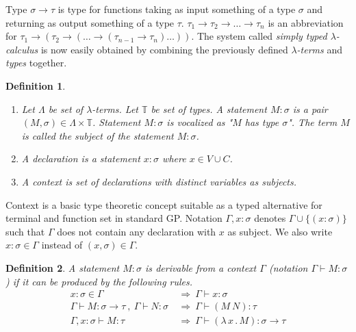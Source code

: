 \documentclass[conference]{IEEEtran}
\newtheorem{definition}{Definition}
\newcommand{\lterms}{$\lambda$-terms\xspace}
\newcommand{\tur}[3]{#1\vdash{}#2 \colon #3}
\newcommand{\then}{\Rightarrow\xspace}
\newcommand{\lamb}[2]{( \lambda \, #1 \, . \, #2 )}
\newcommand{\ar}{\rightarrow\xspace}
\begin{document}
Type $\sigma \ar \tau$ is type for functions taking as input
something of a type $\sigma$ and returning 
as output something of a type $\tau$. 
$\tau_1 \ar \tau_2 \ar \dots \ar \tau_n$ is an abbreviation for 
$\tau_1 \ar (\tau_2 \ar (\dots \ar (\tau_{n-1} \ar \tau_n)\dots))$.
The system called \textit{simply typed $\lambda$-calculus} is now easily obtained by
combining the previously defined \textit{\lterms} and \textit{types} together. \\


\begin{definition}~

\begin{enumerate}
 \item 	Let $\Lambda$ be set of {\it \lterms}. 
	Let $\mathbb{T}$ be set of {\it types}.       
	A {\it statement} $M : \sigma$ is a pair 
	$(M,\sigma) \in \Lambda \times \mathbb{T}$.
	Statement $M : \sigma$ is vocalized as 
	{\it "$M$ has type $\sigma$"}.
	The term $M$ is called the {\it subject} of the 
	statement $M : \sigma$.
 \item A \textit{declaration} is a statement 
 $x : \sigma$ where $x \in V \cup C$.
  
 \item A \textit{context} 
 is set of declarations with distinct variables as subjects.
\end{enumerate}
\end{definition}

Context is a basic type theoretic concept suitable as a typed alternative
for terminal and function set in standard GP. 
Notation $\Gamma,x:\sigma $ denotes $ \Gamma\cup\{(x:\sigma)\}$ 
such that $\Gamma$ does not contain any declaration with $x$ as subject.
We also write $x:\sigma \in \Gamma$ instead of $(x,\sigma) \in \Gamma$.\\

\begin{definition}
A statement $M\colon\sigma$ is \textit{derivable from}
a context $\Gamma$ (notation 
\mbox{$\Gamma\vdash{}M\colon\sigma$}) 
if it can be produced by the following rules.
\begin{align*}
x : \sigma \in \Gamma &~\then~ \tur{\Gamma}{x}{\sigma}\\
\tur{\Gamma}{M}{\sigma \ar \tau}~,~\tur{\Gamma}{N}{\sigma} 
&~\then~ \tur{\Gamma}{(M~N)}{\tau}\\  
\tur{\Gamma,x:\sigma}{M}{\tau}
&~\then~ \tur{\Gamma}{\lamb{x}{M}}{\sigma \ar \tau} 
\end{align*}
\end{definition}
~\\
\end{document}
